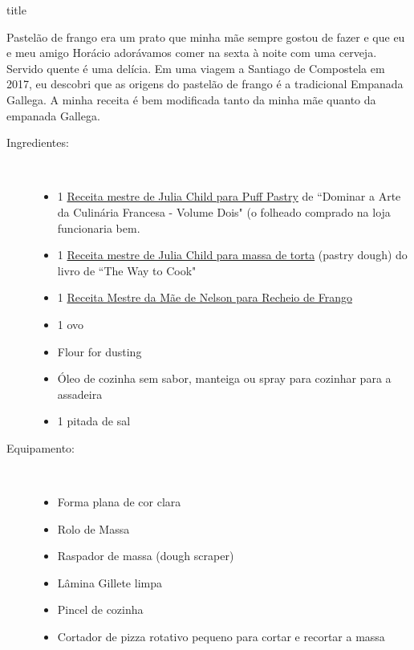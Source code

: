 \documentclass [11pt, letterpaper] {article}
\begin{document}
 {title}

Pastel\~ao de frango era um prato que minha m\~ae sempre gostou de fazer e que eu e meu amigo Hor\'acio ador\'avamos comer na sexta \`a noite com uma cerveja. Servido quente \'e uma del\'icia. Em uma viagem a Santiago de Compostela em 2017, eu descobri que as origens do pastel\~ao de frango \'e a tradicional Empanada Gallega. A minha receita \'e bem modificada tanto da minha m\~ae quanto da empanada Gallega. 

\begin {description}

\item [Ingredientes:] \ \\
        \begin {itemize}
        \item 1 \href{PuffyPastry.html}{Receita mestre de Julia Child para Puff Pastry} de ``Dominar a Arte da Culinária Francesa - Volume Dois" (o folheado comprado na loja funcionaria bem.
        \item 1 \href{PastryDough.html}{Receita mestre de Julia Child para massa de torta} (pastry dough) do livro de ``The Way to Cook"
        \item 1 \href{ChickenFilling.html}{Receita Mestre da Mãe de Nelson para Recheio de Frango}
        \item 1 ovo
        \item Flour for dusting
        \item Óleo de cozinha sem sabor, manteiga ou spray para cozinhar para a assadeira
        \item 1 pitada de sal
        \end {itemize}

\item[Equipamento:] \ \\
        \begin {itemize}
        \item Forma plana de cor clara 
        \item Rolo de Massa
        \item Raspador de massa (dough scraper)
        \item L\^amina Gillete limpa
        \item Pincel de cozinha 
        \item Cortador de pizza rotativo pequeno para cortar e recortar a massa
        \end {itemize}


\end{description}
\end{document}
